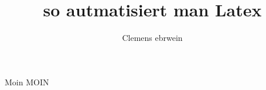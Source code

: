 \documentclass{article}
\title{so autmatisiert man Latex}
\author{Clemens ebrwein}
\begin{document}
\maketitle
\newpage
Moin MOIN
\end{document}
